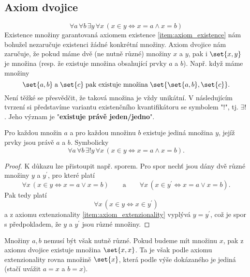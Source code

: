 \subsection{Axiom dvojice}
\begin{equation*}
    \forall a\,\forall b\,\exists y\,\forall x\,(x \in y \iff x=a \land x=b)
\end{equation*}
Existence množiny garantovaná axiomem existence \ref{item:axiom_existence} nám bohužel nezaručuje existenci žádné konkrétní množiny. Axiom dvojice nám zaručuje, že pokud máme dvě (ne nutně různé) množiny $x$ a $y$, pak i $\set{x,y}$ je množina (resp. že existuje množina obsahující prvky $a$ a $b$). Např. když máme množiny
\begin{equation*}
    \set{a,b}\;\text{a}\;\set{c}\;\text{pak existuje množina}\;\set{\set{a,b},\set{c}}.
\end{equation*}
Není těžké se přesvědčit, že taková množina je vždy unikátní. V následujícím tvrzení si představíme variantu existenčního kvantifikátoru se symbolem "$!$", tj. $\exists!$. Jeho význam je "\textbf{existuje právě jeden/jedno}".
\begin{lemma}\label{lem:univerzalnost_neusp_dvojic}
    Pro každou množin $a$ a pro každou množinu $b$ existuje jediná množina $y$, jejíž prvky jsou právě $a$ a $b$. Symbolicky
    \begin{equation*}
        \forall a\,\forall b\,\exists!y\,\forall x\,(x \in y \iff x=a \land x=b).
    \end{equation*}
\end{lemma}
\begin{proof}
    K důkazu lze přistoupit např. sporem. Pro spor nechť jsou dány dvě různé množiny $y$ a $y^\prime$, pro které platí
    \begin{equation*}
        \forall x\,(x\in y \iff x=a \lor x=b)\qquad \text{a}\qquad\forall x\, (x\in y^\prime \iff x=a \lor x=b).
    \end{equation*}
    Pak tedy platí
    \begin{equation*}
        \forall x\,(x\in y \iff x\in y^\prime)
    \end{equation*}
    a z axiomu extenzionality \ref{item:axiom_extenzionality} vyplývá $y=y^\prime$, což je spor s předpokladem, že $y$ a $y^\prime$ jsou různé množiny.
\end{proof}
Množiny $a,b$ nemusí být však nutně různé. Pokud budeme mít množinu $x$, pak z axiomu dvojice existuje množina $\set{x,x}$. Ta je však podle axiomu extenzionality rovna množině $\set{x}$, která podle výše dokázaného je jediná (stačí uvážit $a=x$ a $b=x$).
